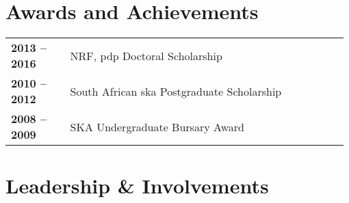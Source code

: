 \documentclass{article}
\newcommand{\itm}[1]{\textbf{#1}}
\newcommand{\saao}{\gls*{saao}\xspace}
\newcommand{\ska}{\gls*{ska}\xspace}
\newcommand{\pdp}{\gls*{pdp}\xspace}
\begin{document}
% 
%  
%  
%  
  



\section{Awards and Achievements}
\begin{tabular}{p{0.175\linewidth} p{0.8\linewidth}}
  \itm{2013 -- 2016}     & NRF, \pdp Doctoral Scholarship \\
  \itm{2010 -- 2012}     & South African \ska Postgraduate Scholarship \\
  \itm{2008 -- 2009}     & SKA Undergraduate Bursary Award\\
\end{tabular}

 
\section{Leadership \& Involvements}
\end{document}
